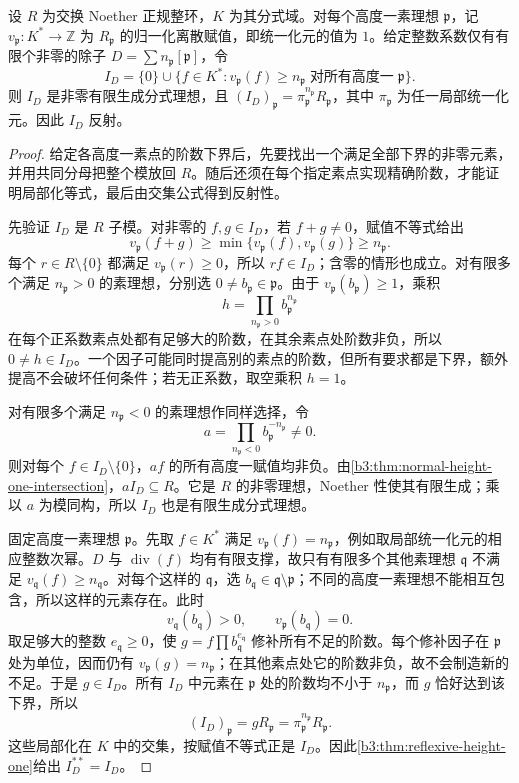 \begin{lemma}\label{b3:lem:divisor-fractional-module}
	设 \(R\) 为交换 Noether 正规整环，\(K\) 为其分式域。对每个高度一素理想 \(\mathfrak p\)，记 \(v_{\mathfrak p}:K^*\rightarrow\mathbb Z\) 为 \(R_{\mathfrak p}\) 的归一化离散赋值，即统一化元的值为 \(1\)。给定整数系数仅有有限个非零的除子 \(D=\sum n_{\mathfrak p}[\mathfrak p]\)，令
	\[
		I_D=\{0\}\cup\{f\in K^*:v_{\mathfrak p}(f)\ge n_{\mathfrak p} \;\text{对所有高度一}\;\mathfrak p\}.
	\]
	则 \(I_D\) 是非零有限生成分式理想，且 \((I_D)_{\mathfrak p}=\pi_{\mathfrak p}^{n_{\mathfrak p}}R_{\mathfrak p}\)，其中 \(\pi_{\mathfrak p}\) 为任一局部统一化元。因此 \(I_D\) 反射。
\end{lemma}
\begin{proof}
	给定各高度一素点的阶数下界后，先要找出一个满足全部下界的非零元素，并用共同分母把整个模放回 \(R\)。随后还须在每个指定素点实现精确阶数，才能证明局部化等式，最后由交集公式得到反射性。

	先验证 \(I_D\) 是 \(R\) 子模。对非零的 \(f,g\in I_D\)，若 \(f+g\ne0\)，赋值不等式给出
	\[
		v_{\mathfrak p}(f+g)\ge \min\{v_{\mathfrak p}(f),v_{\mathfrak p}(g)\}\ge n_{\mathfrak p}.
	\]
	每个 \(r\in R\setminus\{0\}\) 都满足 \(v_{\mathfrak p}(r)\ge0\)，所以 \(rf\in I_D\)；含零的情形也成立。对有限多个满足 \(n_{\mathfrak p}>0\) 的素理想，分别选 \(0\ne b_{\mathfrak p}\in\mathfrak p\)。由于 \(v_{\mathfrak p}(b_{\mathfrak p})\ge1\)，乘积
	\[
		h=\prod_{n_{\mathfrak p}>0}b_{\mathfrak p}^{n_{\mathfrak p}}
	\]
	在每个正系数素点处都有足够大的阶数，在其余素点处阶数非负，所以 \(0\ne h\in I_D\)。一个因子可能同时提高别的素点的阶数，但所有要求都是下界，额外提高不会破坏任何条件；若无正系数，取空乘积 \(h=1\)。

	对有限多个满足 \(n_{\mathfrak p}<0\) 的素理想作同样选择，令
	\[
		a=\prod_{n_{\mathfrak p}<0}b_{\mathfrak p}^{-n_{\mathfrak p}}\ne0.
	\]
	则对每个 \(f\in I_D\setminus\{0\}\)，\(af\) 的所有高度一赋值均非负。由\cref{b3:thm:normal-height-one-intersection}，\(aI_D\subseteq R\)。它是 \(R\) 的非零理想，Noether 性使其有限生成；乘以 \(a\) 为模同构，所以 \(I_D\) 也是有限生成分式理想。

	固定高度一素理想 \(\mathfrak p\)。先取 \(f\in K^*\) 满足 \(v_{\mathfrak p}(f)=n_{\mathfrak p}\)，例如取局部统一化元的相应整数次幂。\(D\) 与 \(\operatorname{div}(f)\) 均有有限支撑，故只有有限多个其他素理想 \(\mathfrak q\) 不满足 \(v_{\mathfrak q}(f)\ge n_{\mathfrak q}\)。对每个这样的 \(\mathfrak q\)，选 \(b_{\mathfrak q}\in\mathfrak q\setminus\mathfrak p\)；不同的高度一素理想不能相互包含，所以这样的元素存在。此时
	\[
		v_{\mathfrak q}(b_{\mathfrak q})>0, \qquad v_{\mathfrak p}(b_{\mathfrak q})=0.
	\]
	取足够大的整数 \(e_{\mathfrak q}\ge0\)，使 \(g=f\prod b_{\mathfrak q}^{e_{\mathfrak q}}\) 修补所有不足的阶数。每个修补因子在 \(\mathfrak p\) 处为单位，因而仍有 \(v_{\mathfrak p}(g)=n_{\mathfrak p}\)；在其他素点处它的阶数非负，故不会制造新的不足。于是 \(g\in I_D\)。所有 \(I_D\) 中元素在 \(\mathfrak p\) 处的阶数均不小于 \(n_{\mathfrak p}\)，而 \(g\) 恰好达到该下界，所以
	\[
		(I_D)_{\mathfrak p}=gR_{\mathfrak p} =\pi_{\mathfrak p}^{n_{\mathfrak p}}R_{\mathfrak p}.
	\]
	这些局部化在 \(K\) 中的交集，按赋值不等式正是 \(I_D\)。因此\cref{b3:thm:reflexive-height-one}给出 \(I_D^{**}=I_D\)。
\end{proof}

